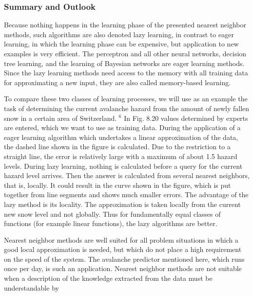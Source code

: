 \documentclass[10pt]{article}
\begin{document}
\subsubsection*{Summary and Outlook}
Because nothing happens in the learning phase of the presented nearest neighbor methods, such algorithms are also denoted lazy learning, in contrast to eager learning, in which the learning phase can be expensive, but application to new examples is very efficient. The perceptron and all other neural networks, decision tree learning, and the learning of Bayesian networks are eager learning methods. Since the lazy learning methods need access to the memory with all training data for approximating a new input, they are also called memory-based learning.

To compare these two classes of learning processes, we will use as an example the task of determining the current avalanche hazard from the amount of newly fallen snow in a certain area of Switzerland. ${ }^{6}$ In Fig. 8.20 values determined by experts are entered, which we want to use as training data. During the application of a eager learning algorithm which undertakes a linear approximation of the data, the dashed line shown in the figure is calculated. Due to the restriction to a straight line, the error is relatively large with a maximum of about 1.5 hazard levels. During lazy learning, nothing is calculated before a query for the current hazard level arrives. Then the answer is calculated from several nearest neighbors, that is, locally. It could result in the curve shown in the figure, which is put together from line segments and shows much smaller errors. The advantage of the lazy method is its locality. The approximation is taken locally from the current new snow level and not globally. Thus for fundamentally equal classes of functions (for example linear functions), the lazy algorithms are better.

Nearest neighbor methods are well suited for all problem situations in which a good local approximation is needed, but which do not place a high requirement on the speed of the system. The avalanche predictor mentioned here, which runs once per day, is such an application. Nearest neighbor methods are not suitable when a description of the knowledge extracted from the data must be understandable by
\end{document}
